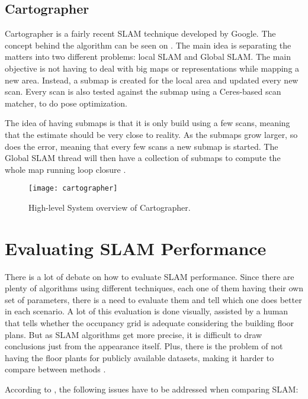 \subsection{Cartographer}

Cartographer is a fairly recent SLAM technique developed by Google. The concept behind the algorithm can be seen on . The main idea is separating the matters into two different problems: local SLAM and Global SLAM. The main objective is not having to deal with big maps or representations while mapping a new area. Instead, a submap is created for the local area and updated every new scan. Every scan is also tested against the submap using a Ceres-based scan matcher, to do pose optimization.

The idea of having submaps is that it is only build using a few scans, meaning that the estimate should be very close to reality. As the submaps grow larger, so does the error, meaning that every few scans a new submap is started. The Global SLAM thread will then have a collection of submaps to compute the whole map running loop closure \cite{cartographer2016google}.

\begin{figure}[!ht]
    \centering
    \texttt{[image: cartographer]}
    \caption{High-level System overview of Cartographer.}
    \label{fig:cartographer}
\end{figure}

\section{Evaluating SLAM Performance}

There is a lot of debate on how to evaluate SLAM performance. Since there are plenty of algorithms using different techniques, each one of them having their own set of parameters, there is a need to evaluate them and tell which one does better in each scenario. A lot of this evaluation is done visually, assisted by a human that tells whether the occupancy grid is adequate considering the building floor plans. But as SLAM algorithms get more precise, it is difficult to draw conclusions just from the appearance itself. Plus, there is the problem of not having the floor plants for publicly available datasets, making it harder to compare between methods \cite{kummerle2009measuring}.

According to \citeauthor{amigoni2007good}, the following issues have to be addressed when comparing SLAM:

